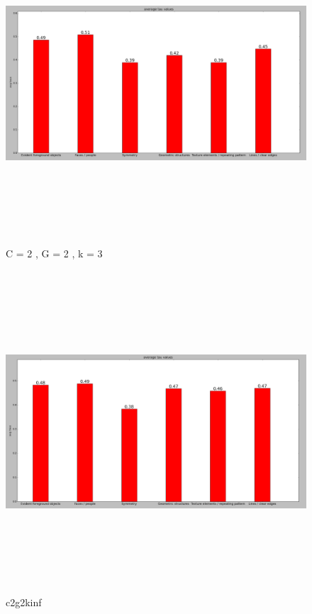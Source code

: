 		\begin{figure}[h] \label{c2g2k3}
			\includegraphics[width=\linewidth,height=12cm,keepaspectratio]{Figures/c2g2k3}
			\caption[C = 2 , G = 2 , k = 3]
			{C = 2 , G = 2 , k = 3}
		\end{figure}
		
		\begin{figure}[h] \label{c2g2kinf}
			\includegraphics[width=\linewidth,height=12cm,keepaspectratio]{Figures/c2g2kinf}
			\caption[c2g2kinf]
			{c2g2kinf}
		\end{figure}
		
